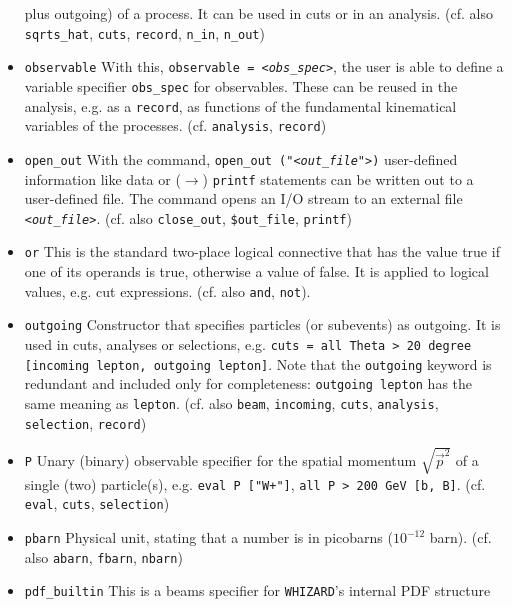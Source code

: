 \documentclass[12pt]{book}
\newcommand{\ttt}[1]{\texttt{#1}}
\newcommand{\whizard}{\ttt{WHIZARD}}
\begin{document}
\begin{itemize}
plus outgoing) of a process. It can be used in cuts or in an
analysis. (cf. also \ttt{sqrts\_hat}, \ttt{cuts}, \ttt{record},
\ttt{n\_in}, \ttt{n\_out})
\item
\ttt{observable} \newline
With this, \ttt{observable = {\em <obs\_spec>}}, the user is able to define
a variable specifier \ttt{obs\_spec} for observables. These can be
reused in the analysis, e.g. as a \ttt{record}, as functions of the
fundamental kinematical variables of the processes.
(cf. \ttt{analysis}, \ttt{record})
\item
\ttt{open\_out} \newline
With the command, \ttt{open\_out ("{\em <out\_file">})} user-defined
information like data or ($\to$) \ttt{printf} statements can be
written out to a user-defined file. The command opens an I/O stream to
an external file \ttt{{\em <out\_file>}}. (cf. also \ttt{close\_out},
\ttt{\$out\_file}, \ttt{printf})
\item
\ttt{or} \newline
This is the standard two-place logical connective that has the value
true if one of its operands is true, otherwise a value of false. It
is applied to logical values, e.g. cut expressions. (cf. also
\ttt{and}, \ttt{not}).
\item
\ttt{outgoing} \newline
Constructor that specifies particles (or subevents) as outgoing. It is
used in cuts, analyses or selections, e.g. \ttt{cuts = all Theta > 20
degree [incoming lepton, outgoing lepton]}. Note that the \ttt{outgoing}
keyword is redundant and included only for completeness: \ttt{outgoing lepton}
has the same meaning as \ttt{lepton}.  (cf. also \ttt{beam},
\ttt{incoming},
\ttt{cuts}, \ttt{analysis}, \ttt{selection}, \ttt{record})
\item
\ttt{P} \newline
Unary (binary) observable specifier for the spatial momentum
$\sqrt{\vec{p}^2}$ of a single (two) particle(s), e.g. \ttt{eval P
["W+"]}, \ttt{all P > 200 GeV [b, B]}. (cf. \ttt{eval}, \ttt{cuts},
\ttt{selection})
\item
\ttt{pbarn} \newline
Physical unit, stating that a number is in picobarns ($10^{-12}$
barn). (cf. also \ttt{abarn}, \ttt{fbarn}, \ttt{nbarn})
\item
\ttt{pdf\_builtin} \newline
This is a beams specifier for \whizard's internal PDF structure

\end{itemize}
\end{document}
